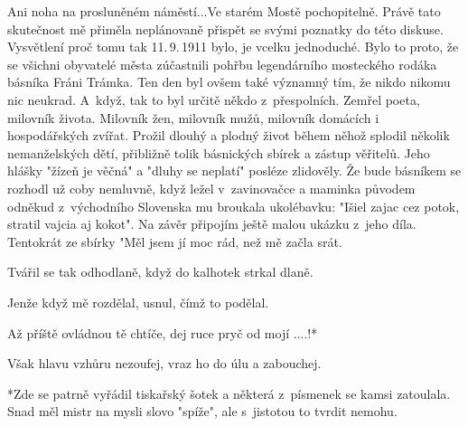 
Ani noha na prosluněném náměstí...Ve starém Mostě pochopitelně. Právě
tato skutečnost mě přiměla neplánovaně přispět se svými poznatky do
této diskuse. Vysvětlení proč tomu tak 11.\,9.\,1911 bylo, je vcelku
jednoduché. Bylo to proto, že se všichni obyvatelé města zúčastnili
pohřbu legendárního mosteckého rodáka básníka Fráni Trámka. Ten den
byl ovšem také významný tím, že nikdo nikomu nic neukrad. A~když, tak
to byl určitě někdo z~přespolních. Zemřel poeta, milovník života.
Milovník žen, milovník mužů, milovník domácích i hospodářských zvířat.
Prožil dlouhý a plodný život během něhož splodil několik nemanželských
dětí, přibližně tolik básnických sbírek a zástup věřitelů. Jeho hlášky
"žízeň je věčná" a "dluhy se neplatí" posléze zlidověly. Že bude
básníkem se rozhodl už coby nemluvně, když ležel v~zavinovačce a
maminka původem odněkud z~východního Slovenska mu broukala ukolébavku:
"Išiel zajac cez potok, stratil vajcia aj kokot". Na závěr připojím
ještě malou ukázku z~jeho díla. Tentokrát ze sbírky "Měl jsem jí moc
rád, než mě začla srát.

Tvářil se tak odhodlaně, když do kalhotek strkal dlaně.

Jenže když mě rozdělal, usnul, čímž to podělal.

Až příště ovládnou tě chtíče, dej ruce pryč od mojí ....!*

Však hlavu vzhůru nezoufej, vraz ho do úlu a zabouchej.

*Zde se patrně vyřádil tiskařský šotek a některá z~písmenek se kamsi zatoulala. Snad měl mistr na mysli slovo "spíže", ale s~jistotou to tvrdit nemohu.

